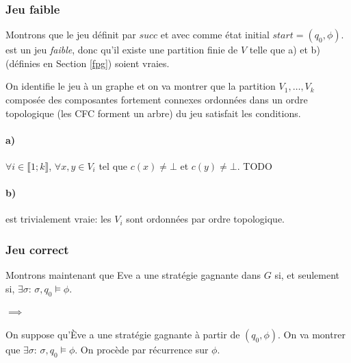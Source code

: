 \documentclass[10pt,a4paper]{article}
\begin{document}
\subsubsection{Jeu faible}
Montrons que le jeu définit par $succ$ et avec comme état initial $start = (q_0, \phi)$.
 est un jeu \emph{faible}, donc qu'il existe une partition finie de $V$ telle que a) et b) (définies en Section \ref{fpg}) soient vraies.

On identifie le jeu à un graphe et on va montrer que la partition $V_1, \dots, V_k$ composée des composantes fortement connexes ordonnées dans un ordre topologique (les CFC forment un arbre) du jeu satisfait les conditions.

\paragraph{a)}
$\forall i \in \llbracket 1 ; k \rrbracket$, $\forall x,y \in V_i$ tel que $c(x) \neq \bot$ et $c(y) \neq \bot$. TODO

\paragraph{b)} est trivialement vraie: les $V_i$ sont ordonnées par ordre topologique.

\subsubsection{Jeu correct}
Montrons maintenant que Eve a une stratégie gagnante dans $G$ si, et seulement si, $\exists \sigma$: $\sigma,q_0 \vDash \phi$.

\paragraph{$\implies$}
On suppose qu'Ève a une stratégie gagnante à partir de $(q_0, \phi)$. On va montrer que $\exists \sigma$: $\sigma,q_0 \vDash \phi$. On procède par récurrence sur $\phi$.
\end{document}
